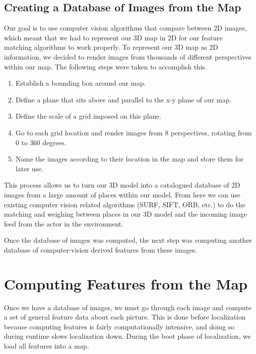 \documentclass[a4paper,11pt]{article}
\begin{document}
  \subsection{Creating a Database of Images from the Map}
  Our goal is to use computer vision algorithms that compare between 2D images, which meant that we had to represent our 3D map in 2D for our feature matching algorithms to work properly. To represent our 3D map as 2D information, we decided to render images from thousands of different perspectives within our map. The following steps were taken to accomplish this.
  \begin{enumerate}
  \item Establish a bounding box around our map.
  \item Define a plane that sits above and parallel to the x-y plane of our map.
  \item Define the scale of a grid imposed on this plane.
  \item Go to each grid location and render images from 8 perspectives, rotating from 0 to 360 degrees.
  \item Name the images according to their location in the map and store them for later use.
  \end{enumerate}

  This process allows us to turn our 3D model into a catalogued database of 2D images from a large amount of places within our model. From here we can use existing computer vision related algorithms (SURF, SIFT, ORB, etc.) to do the matching and weighing between places in our 3D model and the incoming image feed from the actor in the environment. 

  Once the database of images was computed, the next step was computing another database of computer-vision derived features from these images.


  \section{Computing Features from the Map}
Once we have a database of images, we must go through each image and compute a set of general feature data about each picture. This is done before localization because computing features is fairly computationally intensive, and doing so during runtime slows localization down. During the boot phase of localization, we load all features into a map.
\end{document}
